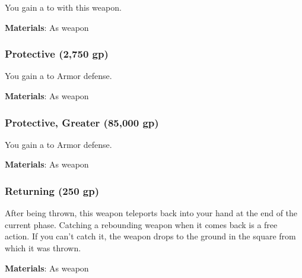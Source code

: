 You gain a   to  with this weapon.



\vspace{0.25em}
\textbf{Materials}: As weapon


\lowercase{\hypertarget{item:Protective}{}}\label{item:Protective}
\hypertarget{item:Protective}{\subsubsection{Protective\hfill{} (2,750 gp)}}

You gain a   to Armor defense.



\vspace{0.25em}
\textbf{Materials}: As weapon


\lowercase{\hypertarget{item:Protective, Greater}{}}\label{item:Protective, Greater}
\hypertarget{item:Protective, Greater}{\subsubsection{Protective, Greater\hfill{} (85,000 gp)}}

You gain a   to Armor defense.



\vspace{0.25em}
\textbf{Materials}: As weapon


\lowercase{\hypertarget{item:Returning}{}}\label{item:Returning}
\hypertarget{item:Returning}{\subsubsection{Returning\hfill{} (250 gp)}}

After being thrown, this weapon teleports back into your hand at the end of the current phase.
Catching a rebounding weapon when it comes back is a free action.
If you can't catch it, the weapon drops to the ground in the square from which it was thrown.



\vspace{0.25em}
\textbf{Materials}: As weapon


